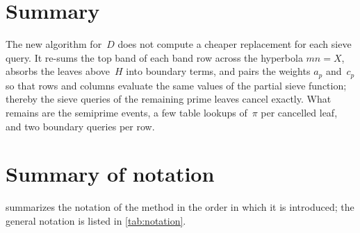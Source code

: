 \documentclass[11pt,a4paper]{amsart}
\numberwithin{equation}{section}
\begin{document}
\section{Summary}\label{sec:summary}

The new algorithm for~$D$ does not compute a cheaper replacement for each
sieve query. It re-sums the top band of each band row across the hyperbola
$mn=X$, absorbs the leaves above~$H$ into boundary terms, and pairs the weights
$a_p$ and~$c_p$ so that rows and columns evaluate the same values of the partial
sieve function; thereby the sieve queries of the remaining prime leaves cancel
exactly. What remains are the semiprime events, a few table
lookups of~$\pi$ per cancelled leaf, and two boundary queries per row.

\appendix
\section{Summary of notation}\label{app:notation}

 summarizes the notation of the method in the order in which
it is introduced; the general notation is listed in \cref{tab:notation}.
\end{document}
